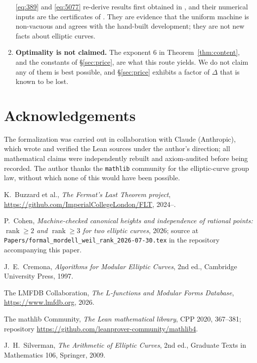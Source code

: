 \documentclass[11pt,reqno]{amsart}
\theoremstyle{plain}
\theoremstyle{definition}
\theoremstyle{remark}
\DeclareRobustCommand{\lt}[1]{\texttt{#1}}
\DeclareMathOperator{\rank}{rank}
\begin{document}
\begin{enumerate}[label=\textup{(\alph*)}]
        \eqref{eq:389} and \eqref{eq:5077} re-derive results first
        obtained in \cite{MW}, and their numerical inputs are the
        certificates of \cite{MW}. They are evidence that the uniform
        machine is non-vacuous and agrees with the hand-built
        development; they are not new facts about elliptic curves.
  \item \textbf{Optimality is not claimed.} The exponent $6$ in
        Theorem~\ref{thm:content}, and the constants of
        \S\ref{sec:price}, are what this route yields. We do not claim
        any of them is best possible, and \S\ref{sec:price} exhibits a
        factor of $\Delta$ that is known to be lost.
\end{enumerate}

\section*{Acknowledgements}

The formalization was carried out in collaboration with Claude
(Anthropic), which wrote and verified the Lean sources under the
author's direction; all mathematical claims were independently rebuilt
and axiom-audited before being recorded. The author thanks the
\texttt{mathlib} community for the elliptic-curve group law, without
which none of this would have been possible.

\begin{thebibliography}{9}

K.~Buzzard et al.,
\emph{The Fermat's Last Theorem project},
\url{https://github.com/ImperialCollegeLondon/FLT}, 2024--.

P.~Cohen,
\emph{Machine-checked canonical heights and independence of rational
points: $\rank \ge 2$ and $\rank \ge 3$ for two elliptic curves},
2026; source at \lt{Papers/formal\_mordell\_weil\_rank\_2026-07-30.tex}
in the repository accompanying this paper.

J.~E.~Cremona,
\emph{Algorithms for Modular Elliptic Curves},
2nd ed., Cambridge University Press, 1997.

The LMFDB Collaboration,
\emph{The $L$-functions and Modular Forms Database},
\url{https://www.lmfdb.org}, 2026.

The mathlib Community,
\emph{The Lean mathematical library},
CPP 2020, 367--381; repository
\url{https://github.com/leanprover-community/mathlib4}.

J.~H.~Silverman,
\emph{The Arithmetic of Elliptic Curves},
2nd ed., Graduate Texts in Mathematics 106, Springer, 2009.

\end{thebibliography}
\end{document}

